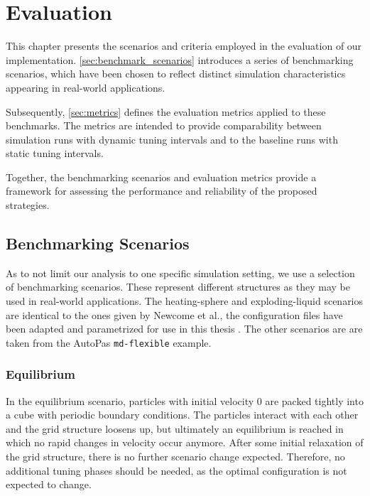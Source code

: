 \chapter[Evaluation]{Evaluation}
\label{cp:evaluation}

{
	\parindent0pt
This chapter presents the scenarios and criteria employed in the evaluation of our implementation. \autoref{sec:benchmark_scenarios} introduces a series of benchmarking scenarios, which have been chosen to reflect distinct simulation characteristics appearing in real-world applications.

Subsequently, \autoref{sec:metrics} defines the evaluation metrics applied to these benchmarks. The metrics are intended to provide comparability between simulation runs with dynamic tuning intervals and to the baseline runs with static tuning intervals.

Together, the benchmarking scenarios and evaluation metrics provide a framework for assessing the performance and reliability of the proposed strategies.
}


\section{Benchmarking Scenarios}
\label{sec:benchmark_scenarios}
As to not limit our analysis to one specific simulation setting, we use a selection of benchmarking scenarios. These represent different structures as they may be used in real-world applications.
The heating-sphere and exploding-liquid scenarios are identical to the ones given by Newcome et al., the configuration files have been adapted and parametrized for use in this thesis \cite{Newcome2025}.
The other scenarios are are taken from the AutoPas \texttt{md-flexible} example. %


\subsection{Equilibrium}
\label{subsec:equil}
In the equilibrium scenario, particles with initial velocity $0$ are packed tightly into a cube with periodic boundary conditions. The particles interact with each other and the grid structure loosens up, but ultimately an equilibrium is reached in which no rapid changes in velocity occur anymore. After some initial relaxation of the grid structure, there is no further scenario change expected. Therefore, no additional tuning phases should be needed, as the optimal configuration is not expected to change.


